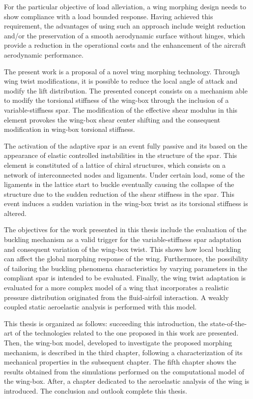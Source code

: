 For the particular objective of load alleviation, a wing morphing design needs to show compliance with a load bounded response. Having achieved this requirement, the advantages of using such an approach include weight reduction and/or the preservation of a smooth aerodynamic surface without hinges, which provide a reduction in the operational costs and the enhancement of the aircraft aerodynamic performance.

The present work is a proposal of a novel wing morphing technology. Through wing twist modifications, it is possible to reduce the local angle of attack and modify the lift distribution. The presented concept consists on a mechanism able to modify the torsional stiffness of the wing-box through the inclusion of a variable-stiffness spar. The modification of the effective shear modulus in this element provokes the wing-box shear center shifting and the consequent modification in wing-box torsional stiffness. 

The activation of the adaptive spar is an event fully passive and its based on the appearance of elastic controlled instabilities in the structure of the spar. This element is constituted of a lattice of chiral structures, which consists on a network of interconnected nodes and ligaments. Under certain load, some of the ligaments in the lattice start to buckle eventually causing the collapse of the structure due to the sudden reduction of the shear stiffness in the spar. This event induces a sudden variation in the wing-box twist as its torsional stiffness is altered.

The objectives for the work presented in this thesis include the evaluation of the buckling mechanism as a valid trigger for the variable-stiffness spar adaptation and consequent variation of the wing-box twist. This shows how local buckling can affect the global morphing response of the wing. Furthermore, the possibility of tailoring the buckling phenomena characteristics by varying parameters in the compliant spar is intended to be evaluated. Finally, the wing twist adaptation is evaluated for a more complex model of a wing that incorporates a realistic pressure distribution originated from the fluid-airfoil interaction. A weakly coupled static aeroelastic analysis is performed with this model. %

This thesis is organized as follows: succeeding this introduction, the state-of-the-art of the technologies related to the one proposed in this work are presented. Then, the wing-box model, developed to investigate the proposed morphing mechanism, is described in the third chapter, following a characterization of its mechanical properties in the subsequent chapter. The fifth chapter shows the results obtained from the simulations performed on the computational model of the wing-box. After, a chapter dedicated to the aeroelastic analysis of the wing is introduced. The conclusion and outlook complete this thesis.